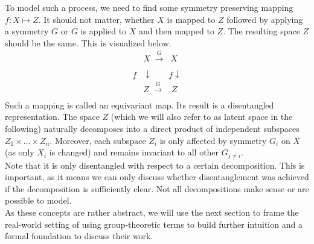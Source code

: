\documentclass{article} %
\begin{document}
To model such a process, we need to find some symmetry preserving mapping $f:X\mapsto Z$. It should not matter, whether $X$ is mapped to $Z$ followed by applying a symmetry $G$ or $G$ is applied to $X$ and then mapped to $Z$. The resulting space $Z$ should be the same. This is visualized below.
\begin{align*}
&X \;\xrightarrow[\text{}]{G}\;\;X\\ 
f&\downarrow \;\;\;\;\;\;\;f\downarrow\\
&Z \;\xrightarrow[\text{}]{G}\;\;\;Z
\end{align*}
Such a mapping is called an equivariant map. Its result is a disentangled representation. The space $Z$ (which we will also refer to as latent space in the following) naturally decomposes into a direct product of independent subspaces $Z_1 \times ... \times Z_n$. Moreover, each subspace $Z_i$ is only affected by symmetry $G_i$ on $X$ (as only $X_i$ is changed) and remains invariant to all other $G_{j \neq i}$.\\
Note that it is only disentangled with respect to a certain decomposition. This is important, as it means we can only discuss whether disentanglement was achieved if the decomposition is sufficiently clear. Not all decompositions make sense or are possible to model.\\
As these concepts are rather abstract, we will use the next section to frame the real-world setting of \citet{hsu2017unsupervised} using group-theoretic terms to build further intuition and a formal foundation to discuss their work.
\end{document}
